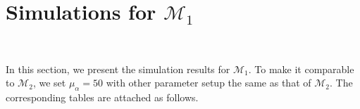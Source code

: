 \documentclass[11pt]{article}
\def\mrm#1{\mathrm{#1}} %
\def\mc#1{\mathcal{#1}} %
\theoremstyle{definition}
\begin{document}


 
\section{Simulations for $\mc{M}_1$}\

\label{tablesm1}


In this section, we present the simulation results for $\mc{M}_1$. To make it comparable to $\mc{M}_2$, we set $\mu_\alpha = 50$ with other parameter setup the same as that of $\mc{M}_2$. The corresponding tables are attached as follows.
\end{document}
